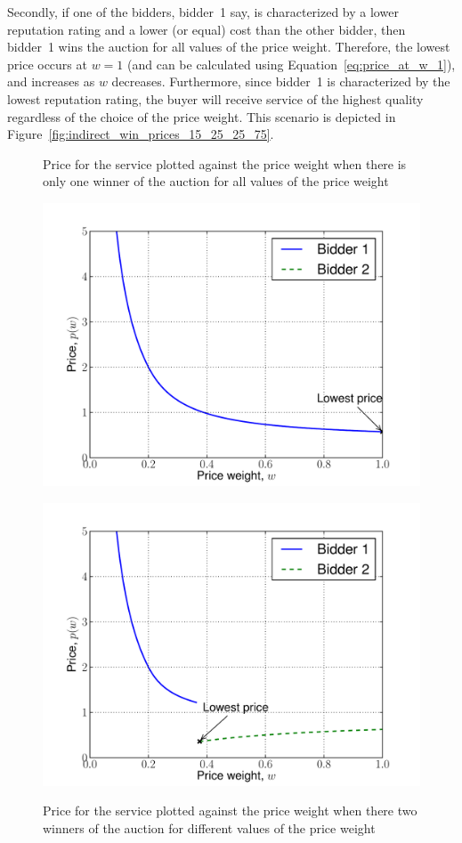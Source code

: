 Secondly, if one of the bidders, bidder~1 say, is characterized by a lower reputation rating and a lower (or equal) cost than the other bidder, then bidder~1 wins the auction for all values of the price weight. Therefore, the lowest price occurs at $w=1$ (and can be calculated using Equation~\eqref{eq:price_at_w_1}), and increases as $w$ decreases. Furthermore, since bidder~1 is characterized by the lowest reputation rating, the buyer will receive service of the highest quality regardless of the choice of the price weight. This scenario is depicted in Figure~\ref{fig:indirect_win_prices_15_25_25_75}.

\begin{figure}[tp!]
  \caption{Price for the service plotted against the price weight when there is only one winner of the auction for all values of the price weight}
  \includegraphics[width=\figsize]{2/Figures/indirect_win_prices_15_25_25_75}
  \label{fig:indirect_win_prices_15_25_25_75}
  \caption{Price for the service plotted against the price weight when there two winners of the auction for different values of the price weight}
  \includegraphics[width=\figsize]{2/Figures/indirect_win_prices_75_25_25_75}
  \label{fig:indirect_win_prices_75_25_25_75}
\end{figure}
